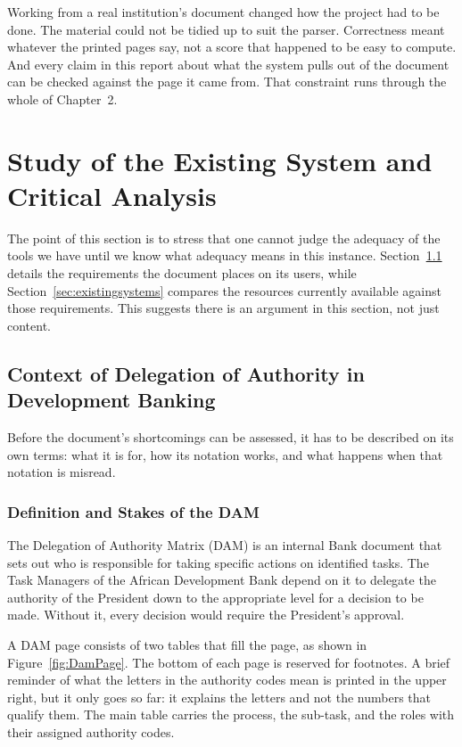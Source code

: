 Working from a real institution's document changed how the project had to be
done. The material could not be tidied up to suit the parser. Correctness meant
whatever the printed pages say, not a score that happened to be easy to compute.
And every claim in this report about what the system pulls out of the document
can be checked against the page it came from. That constraint runs through the
whole of Chapter~2.

\section{Study of the Existing System and Critical Analysis}

The point of this section is to stress that one cannot judge the adequacy of the tools we have until we know what adequacy means in this instance. Section~\ref{sec:damcontext} details the requirements the document places on its users, while Section~\ref{sec:existingsystems} compares the resources currently available against those requirements. This suggests there is an argument in this section, not just content.

\subsection{Context of Delegation of Authority in Development Banking}
\label{sec:damcontext}

Before the document's shortcomings can be assessed, it has to be described on its own
terms: what it is for, how its notation works, and what happens when that notation is
misread.

\subsubsection{Definition and Stakes of the DAM}

The Delegation of Authority Matrix (DAM) is an internal Bank document \citep{afdb_dam} that sets out who is responsible for taking specific actions on identified tasks. The Task Managers of the African Development Bank depend on it to delegate the authority of the President down to the appropriate level for a decision to be made. Without it, every decision would require the President's approval.

A DAM page consists of two tables that fill the page, as shown in Figure~\ref{fig:DamPage}. The bottom of each page is reserved for footnotes. A brief reminder of what the letters in the authority codes mean is printed in the upper right, but it only goes so far: it explains the letters and not the numbers that qualify them. The main table carries the process, the sub-task, and the roles with their assigned authority codes.

